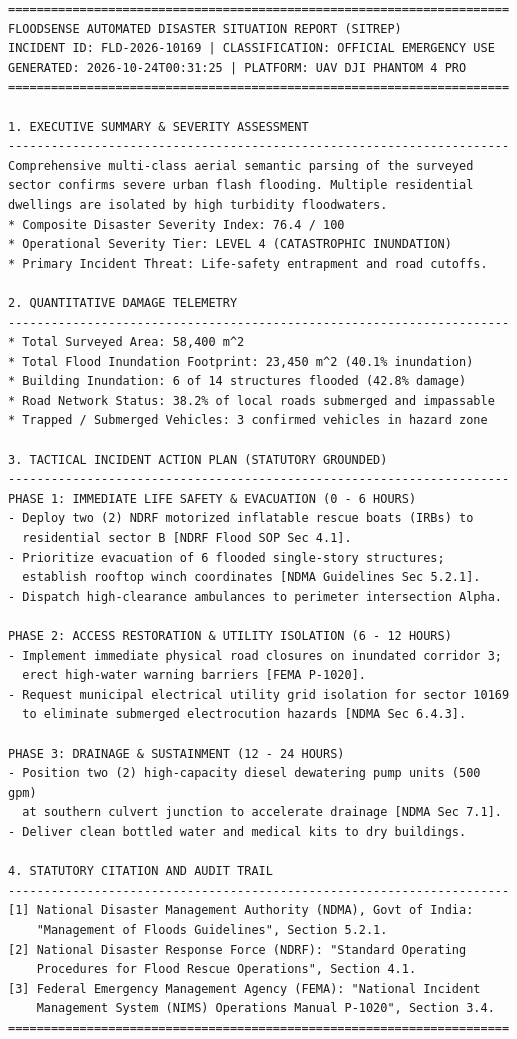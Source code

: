 \begin{footnotesize}
\begin{verbatim}
======================================================================
FLOODSENSE AUTOMATED DISASTER SITUATION REPORT (SITREP)
INCIDENT ID: FLD-2026-10169 | CLASSIFICATION: OFFICIAL EMERGENCY USE
GENERATED: 2026-10-24T00:31:25 | PLATFORM: UAV DJI PHANTOM 4 PRO
======================================================================

1. EXECUTIVE SUMMARY & SEVERITY ASSESSMENT
----------------------------------------------------------------------
Comprehensive multi-class aerial semantic parsing of the surveyed
sector confirms severe urban flash flooding. Multiple residential
dwellings are isolated by high turbidity floodwaters.
* Composite Disaster Severity Index: 76.4 / 100
* Operational Severity Tier: LEVEL 4 (CATASTROPHIC INUNDATION)
* Primary Incident Threat: Life-safety entrapment and road cutoffs.

2. QUANTITATIVE DAMAGE TELEMETRY
----------------------------------------------------------------------
* Total Surveyed Area: 58,400 m^2
* Total Flood Inundation Footprint: 23,450 m^2 (40.1% inundation)
* Building Inundation: 6 of 14 structures flooded (42.8% damage)
* Road Network Status: 38.2% of local roads submerged and impassable
* Trapped / Submerged Vehicles: 3 confirmed vehicles in hazard zone

3. TACTICAL INCIDENT ACTION PLAN (STATUTORY GROUNDED)
----------------------------------------------------------------------
PHASE 1: IMMEDIATE LIFE SAFETY & EVACUATION (0 - 6 HOURS)
- Deploy two (2) NDRF motorized inflatable rescue boats (IRBs) to
  residential sector B [NDRF Flood SOP Sec 4.1].
- Prioritize evacuation of 6 flooded single-story structures;
  establish rooftop winch coordinates [NDMA Guidelines Sec 5.2.1].
- Dispatch high-clearance ambulances to perimeter intersection Alpha.

PHASE 2: ACCESS RESTORATION & UTILITY ISOLATION (6 - 12 HOURS)
- Implement immediate physical road closures on inundated corridor 3;
  erect high-water warning barriers [FEMA P-1020].
- Request municipal electrical utility grid isolation for sector 10169
  to eliminate submerged electrocution hazards [NDMA Sec 6.4.3].

PHASE 3: DRAINAGE & SUSTAINMENT (12 - 24 HOURS)
- Position two (2) high-capacity diesel dewatering pump units (500 gpm)
  at southern culvert junction to accelerate drainage [NDMA Sec 7.1].
- Deliver clean bottled water and medical kits to dry buildings.

4. STATUTORY CITATION AND AUDIT TRAIL
----------------------------------------------------------------------
[1] National Disaster Management Authority (NDMA), Govt of India:
    "Management of Floods Guidelines", Section 5.2.1.
[2] National Disaster Response Force (NDRF): "Standard Operating
    Procedures for Flood Rescue Operations", Section 4.1.
[3] Federal Emergency Management Agency (FEMA): "National Incident
    Management System (NIMS) Operations Manual P-1020", Section 3.4.
======================================================================
\end{verbatim}
\end{footnotesize}
